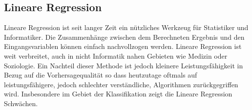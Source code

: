 \documentclass[
  12pt, %
  a4paper, %
  oneside, %
  openany, 
  numbers=noenddot, %
  BCOR=5mm, %
  parskip=half*, %
  thesis, %
]{bfhbook}
\begin{document}
\subsection{Lineare Regression}
\label{lr}
Lineare Regression ist seit langer Zeit ein nützliches Werkzeug für Statistiker und Informatiker. Die Zusammenhänge zwischen dem Berechneten Ergebnis und den Eingangsvariablen können einfach nachvollzogen werden. Lineare Regression ist weit verbreitet, auch in nicht Informatik nahen Gebieten wie Medizin oder Soziologie. Ein Nachteil dieser Methode ist jedoch kleinere Leistungsfähigkeit in Bezug auf die Vorhersagequalität so dass heutzutage oftmals auf leistungsfähigere, jedoch schlechter verständliche, Algorithmen zurückgegriffen wird. Insbesondere im Gebiet der Klassifikation zeigt die Lineare Regression Schwächen.
\end{document}
